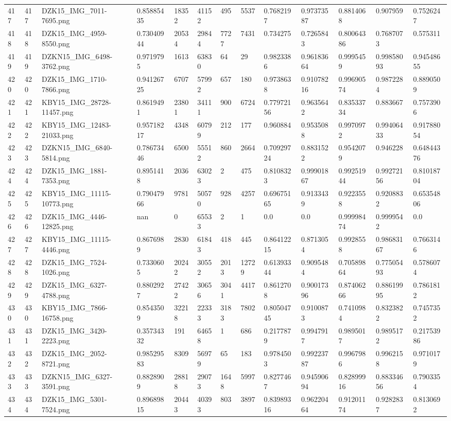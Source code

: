\documentclass[11pt, a4paper, twoside]{report}
\begin{document}
\begin{longtable}[c]{@{}lllllllllllll@{}}
417 & 417 & DZK15\_IMG\_7011-7695.png & 0.85885435 & 18352 & 41152 & 495 & 5537 & 0.7682197 & 0.97373587 & 0.8814068 & 0.907959 & 0.7526247 \\
418 & 418 & DZK15\_IMG\_4959-8550.png & 0.73040944 & 20534 & 29844 & 7727 & 7431 & 0.734275 & 0.7265843 & 0.80064386 & 0.7687073 & 0.575311 \\
419 & 419 & DZKN15\_IMG\_6498-3762.png & 0.9719795 & 1613 & 63830 & 64 & 29 & 0.9823386 & 0.96183664 & 0.9995459 & 0.99858093 & 0.94548655 \\
420 & 420 & DZK15\_IMG\_1710-7866.png & 0.94126725 & 6707 & 57992 & 657 & 180 & 0.9738638 & 0.91078216 & 0.99690574 & 0.9872284 & 0.8890509 \\
421 & 421 & KBY15\_IMG\_28728-11457.png & 0.8619491 & 23801 & 34111 & 900 & 6724 & 0.77972156 & 0.9635642 & 0.83533734 & 0.883667 & 0.7573906 \\
422 & 422 & KBY15\_IMG\_12483-21033.png & 0.95718217 & 4348 & 60799 & 212 & 177 & 0.960884 & 0.9535088 & 0.9970972 & 0.99406433 & 0.91788054 \\
423 & 423 & DZKN15\_IMG\_6840-5814.png & 0.78673446 & 6500 & 55512 & 860 & 2664 & 0.70929724 & 0.8831522 & 0.9542079 & 0.946228 & 0.64844376 \\
424 & 424 & DZK15\_IMG\_1881-7353.png & 0.8951418 & 2036 & 63023 & 2 & 475 & 0.8108323 & 0.99901867 & 0.99251944 & 0.99272156 & 0.81018704 \\
425 & 425 & KBY15\_IMG\_11115-10773.png & 0.79047966 & 9781 & 50570 & 928 & 4257 & 0.69675165 & 0.9133439 & 0.9223558 & 0.9208832 & 0.65354806 \\
426 & 426 & DZK15\_IMG\_4446-12825.png & nan & 0 & 65533 & 2 & 1 & 0.0 & 0.0 & 0.99998474 & 0.9999542 & 0.0 \\
427 & 427 & KBY15\_IMG\_11115-4446.png & 0.8676989 & 2830 & 61843 & 418 & 445 & 0.86412215 & 0.8713054 & 0.9928558 & 0.98683167 & 0.7663146 \\
428 & 428 & DZK15\_IMG\_7524-1026.png & 0.7330605 & 20242 & 30552 & 2013 & 12729 & 0.61393344 & 0.9095484 & 0.70589864 & 0.77505493 & 0.5786074 \\
429 & 429 & DZK15\_IMG\_6327-4788.png & 0.8802927 & 27422 & 30656 & 3041 & 4417 & 0.8612708 & 0.90017396 & 0.87406266 & 0.88619995 & 0.7861812 \\
430 & 430 & KBY15\_IMG\_7866-16758.png & 0.8543509 & 32218 & 22333 & 3183 & 7802 & 0.80504745 & 0.9100873 & 0.7410984 & 0.8323822 & 0.7457352 \\
431 & 431 & DZK15\_IMG\_3420-2223.png & 0.35734332 & 191 & 64658 & 1 & 686 & 0.2177879 & 0.9947917 & 0.9895017 & 0.9895172 & 0.21753986 \\
432 & 432 & DZK15\_IMG\_2052-8721.png & 0.98529583 & 8309 & 56979 & 65 & 183 & 0.9784503 & 0.99223787 & 0.9967986 & 0.9962158 & 0.9710179 \\
433 & 433 & DZKN15\_IMG\_6327-3591.png & 0.8828909 & 28818 & 29073 & 1648 & 5997 & 0.8277467 & 0.94590694 & 0.82899916 & 0.88334656 & 0.7903354 \\
434 & 434 & DZK15\_IMG\_5301-7524.png & 0.89689815 & 20443 & 40393 & 803 & 3897 & 0.83989316 & 0.96220464 & 0.91201174 & 0.9282837 & 0.8130692 \\* \bottomrule
\end{longtable}
\end{document}
